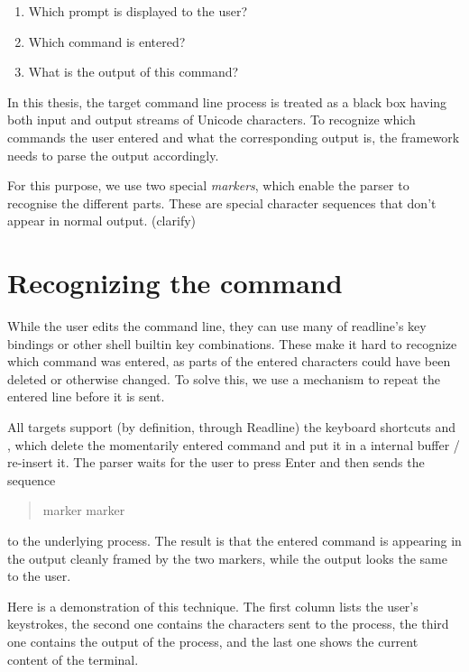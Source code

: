 \documentclass[twoside]{scrreprt}
\begin{document}
\begin{enumerate}
    \item Which prompt is displayed to the user?
    \item Which command is entered?
    \item What is the output of this command?
\end{enumerate}

In this thesis, the target command line process is treated as a black box having both input and output streams of Unicode characters. To recognize which commands the user entered and what the corresponding output is, the framework needs to parse the output accordingly.

For this purpose, we use two special \emph{markers}, which enable the parser to recognise the different parts. These are special character sequences that don't appear in normal output. (clarify)

\section{Recognizing the command}

While the user edits the command line, they can use many of readline's key bindings or other shell builtin key combinations. These make it hard to recognize which command was entered, as parts of the entered characters could have been deleted or otherwise changed. To solve this, we use a mechanism to repeat the entered line before it is sent.

All targets support (by definition, through Readline) the keyboard shortcuts  and , which delete the momentarily entered command and put it in a internal buffer / re-insert it. The parser waits for the user to press Enter and then sends the sequence

\begin{quote}
     marker \keys{\backspace}  marker \keys{\backspace} \keys{\return}
\end{quote}

to the underlying process. The result is that the entered command is appearing in the output cleanly framed by the two markers, while the output looks the same to the user.

Here is a demonstration of this technique. The first column lists the user's keystrokes, the second one contains the characters sent to the process, the third one contains the output of the process, and the last one shows the current content of the terminal.
\end{document}
